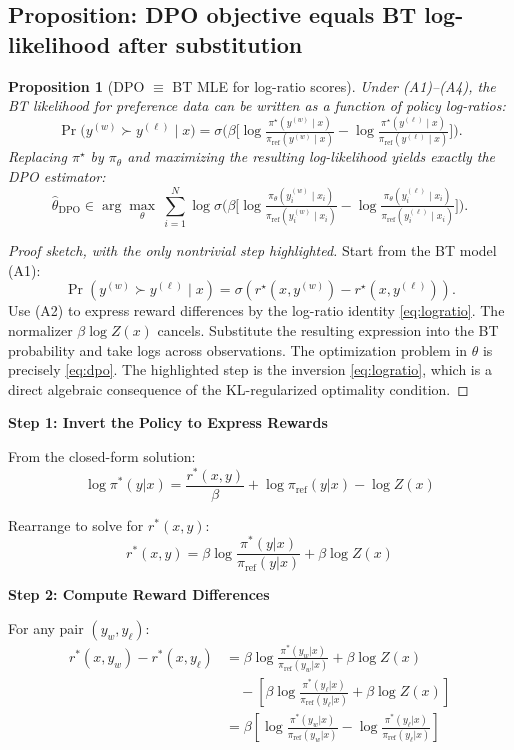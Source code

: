 \documentclass[11pt]{article}
\newcommand{\1}{\mathbf{1}}
\newcommand{\sigmoid}{\sigma}
\theoremstyle{plain}
\newtheorem{proposition}{Proposition}
\theoremstyle{definition}
\theoremstyle{remark}
\begin{document}
\subsection{Proposition: DPO objective equals BT log-likelihood after substitution}
\begin{proposition}[DPO $\equiv$ BT MLE for log-ratio scores]\label{prop:main}
Under (A1)--(A4), the BT likelihood for preference data can be written as a function of policy log-ratios:
\[
\Pr\big(y^{(w)}\succ y^{(\ell)}\mid x\big)
=\sigmoid\!\Big(\beta\big[\log\tfrac{\pi^\star(y^{(w)}\mid x)}{\pi_{\mathrm{ref}}(y^{(w)}\mid x)}-\log\tfrac{\pi^\star(y^{(\ell)}\mid x)}{\pi_{\mathrm{ref}}(y^{(\ell)}\mid x)}\big]\Big).
\]
Replacing $\pi^\star$ by $\pi_\theta$ and maximizing the resulting log-likelihood yields exactly the DPO estimator:
\begin{equation}\label{eq:dpo}
\hat\theta_{\mathrm{DPO}}\in\arg\max_{\theta}\ \sum_{i=1}^N
\log \sigmoid\!\Big(\beta\big[\log\tfrac{\pi_\theta(y_i^{(w)}\mid x_i)}{\pi_{\mathrm{ref}}(y_i^{(w)}\mid x_i)}-\log\tfrac{\pi_\theta(y_i^{(\ell)}\mid x_i)}{\pi_{\mathrm{ref}}(y_i^{(\ell)}\mid x_i)}\big]\Big).
\end{equation}
\end{proposition}

\begin{proof}[Proof sketch, with the only nontrivial step highlighted]
Start from the BT model (A1):
\[
\Pr(y^{(w)}\succ y^{(\ell)}\mid x)=\sigmoid(r^\star(x,y^{(w)})-r^\star(x,y^{(\ell)})).
\]
Use (A2) to express reward differences by the log-ratio identity \eqref{eq:logratio}. The normalizer $\beta\log Z(x)$ cancels.
Substitute the resulting expression into the BT probability and take logs across observations. The optimization problem
in $\theta$ is precisely \eqref{eq:dpo}. The highlighted step is the inversion \eqref{eq:logratio}, which is a direct algebraic
consequence of the KL-regularized optimality condition.
\end{proof}

\noindent \textbf{Step 1: Invert the Policy to Express Rewards}

From the closed-form solution:
$$
\log \pi^*(y|x) = \frac{r^*(x,y)}{\beta} + \log \pi_{\text{ref}}(y|x) - \log Z(x)
$$

Rearrange to solve for $r^*(x,y)$:
$$
r^*(x,y) = \beta \log \frac{\pi^*(y|x)}{\pi_{\text{ref}}(y|x)} + \beta \log Z(x)
$$

\noindent \textbf{Step 2: Compute Reward Differences}

For any pair $(y_w, y_\ell)$:
\begin{align*}
r^*(x,y_w) - r^*(x,y_\ell) &= \beta \log \frac{\pi^*(y_w|x)}{\pi_{\text{ref}}(y_w|x)} + \beta \log Z(x) \\
&\quad - \left[\beta \log \frac{\pi^*(y_\ell|x)}{\pi_{\text{ref}}(y_\ell|x)} + \beta \log Z(x)\right] \\
&= \beta \left[\log \frac{\pi^*(y_w|x)}{\pi_{\text{ref}}(y_w|x)} - \log \frac{\pi^*(y_\ell|x)}{\pi_{\text{ref}}(y_\ell|x)}\right]
\end{align*}
\end{document}
